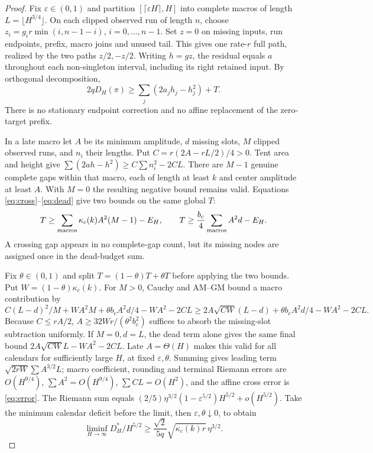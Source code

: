 \documentclass[11pt]{article}
\begin{document}
\begin{proof}
Fix $\varepsilon\in(0,1)$ and partition
$[\lceil\varepsilon H\rceil,H]$ into complete macros of length
$L=\lfloor H^{3/4}\rfloor$. On each clipped observed run of length $n$, choose
$z_i=g_i r\min(i,n-1-i)$, $i=0,\ldots,n-1$.
Set $z=0$ on missing inputs, run endpoints, prefix, macro joins and unused tail.
This gives one rate-$r$ full path, realized by the two paths $z/2,-z/2$.
Writing $h=gz$, the residual equals $a$ throughout each non-singleton interval,
including its right retained input. By orthogonal decomposition,
\begin{equation}\label{eq:adversary}
2qD_H(\pi)\ge \sum_j(2a_jh_j-h_j^2)+T.
\end{equation}
There is no stationary endpoint correction and no affine replacement of
the zero-target prefix.

In a late macro let $A$ be its minimum amplitude, $d$ missing slots,
$M$ clipped observed runs, and $n_i$ their lengths. Put
$C=r(2A-rL/2)/4>0$. Tent area and height give
$\sum(2ah-h^2)\ge C\sum n_i^2-2CL$.
There are $M-1$ genuine complete gaps within that macro, each of length at
least $k$ and center amplitude at least $A$.
With $M=0$ the resulting negative bound remains valid.
Equations \eqref{eq:cross}--\eqref{eq:dead} give two bounds on the same global $T$:
\[
T\ge\sum_{\rm macros}\kappa_c(k)A^2(M-1)-E_H,\qquad
T\ge\frac{b_c}{4}\sum_{\rm macros}A^2d-E_H.
\]
A crossing gap appears in no complete-gap count, but its missing nodes are
assigned once in the dead-budget sum.

Fix $\theta\in(0,1)$ and split $T=(1-\theta)T+\theta T$ before applying the
two bounds. Put $W=(1-\theta)\kappa_c(k)$.
For $M>0$, Cauchy and AM--GM bound a macro contribution by
\[
C(L-d)^2/M+WA^2M+\theta b_cA^2d/4-WA^2-2CL
\ge2A\sqrt{CW}(L-d)+\theta b_cA^2d/4-WA^2-2CL.
\]
Because $C\le rA/2$, $A\ge32Wr/(\theta^2b_c^2)$ suffices to absorb the
missing-slot subtraction uniformly. If $M=0,d=L$, the dead term alone gives
the same final bound $2A\sqrt{CW}L-WA^2-2CL$.
Late $A=\Theta(H)$ makes this valid for all calendars for sufficiently large
$H$, at fixed $\varepsilon,\theta$.
Summing gives leading term
$\sqrt{2rW}\sum A^{3/2}L$; macro coefficient, rounding and terminal Riemann
errors are $O(H^{9/4})$, $\sum A^2=O(H^{9/4})$, $\sum CL=O(H^2)$,
and the affine cross error is \eqref{eq:error}.
The Riemann sum equals
$(2/5)\eta^{3/2}(1-\varepsilon^{5/2})H^{5/2}+o(H^{5/2})$.
Take the minimum calendar deficit before the limit, then
$\varepsilon,\theta\downarrow0$, to obtain
\begin{equation}\label{eq:lower}
\liminf_{H\to\infty}D_H^*/H^{5/2}
\ge\frac{\sqrt2}{5q}\sqrt{\kappa_c(k)r}\,\eta^{3/2}.
\end{equation}


\end{proof}
\end{document}
